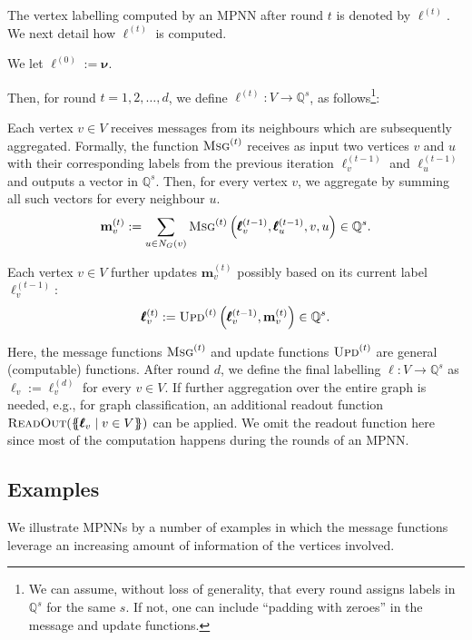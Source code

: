 The vertex labelling computed by an MPNN after round $t$ is denoted by $\pmb{\ell}^{(t)}$. We next detail how $\pmb{\ell}^{(t)}$ is computed.
\begin{description}\setlength{\itemsep}{-0.4ex}
\item [Initialisation.]  We let $\pmb{\ell}^{(0)}:=\pmb{\nu}$.
\end{description}
Then, for round $t=1,2,\ldots,d$, we define $\pmb{\ell}^{(t)}:V\to\mathbb{Q}^{s}$, as follows\footnote{We can assume, without loss of generality, that every round assigns labels in $\mathbb{Q}^s$ for the same $s$. If not, one can include ``padding with zeroes'' in the message and update functions.}:
\begin{description}\setlength{\itemsep}{-0.4ex}
\item [Message Passing.] Each vertex $v\in V$ receives messages from its neighbours which are subsequently aggregated. Formally, the function $\textsc{Msg}^{(t)}$ receives as input two vertices $v$ and $u$ with their corresponding labels from the previous iteration $\pmb{\ell}^{(t-1)}_v$ and $\pmb{\ell}^{(t-1)}_u$ and outputs a vector in $\mathbb{Q}^s$. Then, for every vertex $v$, we aggregate by summing all such vectors for every neighbour $u$.
$$
\mathbf{m}^{(t)}_{v}:=\sum_{u\in N_G(v)}\textsc{Msg}^{(t)}\left(\pmb{\ell}^{(t-1)}_v,\pmb{\ell}^{(t-1)}_u,v,u\right)\in\mathbb{Q}^{s}.
$$
\item [Updating.] Each vertex $v\in V$ further updates $\mathbf{m}^{(t)}_{v}$ possibly based on its current label $\pmb{\ell}^{(t-1)}_v$:
$$
\pmb{\ell}^{(t)}_v:=\textsc{Upd}^{(t)}\left(\pmb{\ell}^{(t-1)}_v,\mathbf{m}^{(t)}_{v}\right)\in\mathbb{Q}^{s}.
$$
\end{description}
Here, the message functions $\textsc{Msg}^{(t)}$ and update functions
$\textsc{Upd}^{(t)}$ are general (computable) functions. After round $d$, we
define the final labelling $\pmb{\ell}:V\to\mathbb{Q}^{s}$ as
$\pmb{\ell}_v:=\pmb{\ell}^{(d)}_v$ for every $v\in V$. If further aggregation
over the entire graph is needed, e.g., for graph classification, an additional
readout function $\textsc{ReadOut}(\{\!\!\{\pmb{\ell}_v\mid v\in V\}\!\!\})$ can be
applied. We omit the readout function here since most of the computation
happens during the rounds of an MPNN.

\subsection{Examples}
We illustrate MPNNs by a number of examples in which the message functions leverage an increasing amount of information of the vertices involved. 

